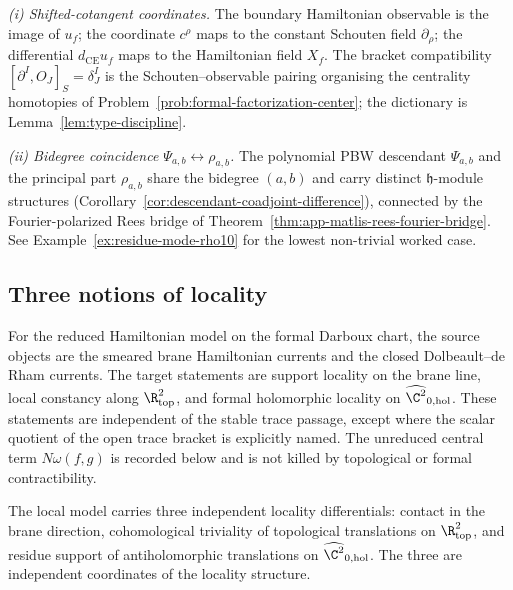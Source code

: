 \documentclass[11pt]{memoir}
\begin{document}
\begin{rmk}\label{rmk:intro-symbol-separation}
  \emph{(i) Shifted-cotangent coordinates.}  The boundary
  Hamiltonian observable is the image of \(u_f\); the coordinate
  \(c^\rho\) maps to the constant Schouten field \(\partial_\rho\);
  the differential \(d_{\mathrm{CE}}u_f\) maps to the Hamiltonian field
  \(X_f\).  The bracket compatibility
  \([\partial^I,O_J]_S=\delta^I_J\) is the Schouten--observable pairing
  organising the centrality homotopies of
  Problem~\ref{prob:formal-factorization-center}; the dictionary is
  Lemma~\ref{lem:type-discipline}.

  \emph{(ii) Bidegree coincidence \(\Psi_{a,b}\leftrightarrow\rho_{a,b}\).}
  The polynomial PBW descendant \(\Psi_{a,b}\) and the principal part
  \(\rho_{a,b}\) share the bidegree \((a,b)\) and carry distinct
  \(\mathfrak h\)-module structures
  (Corollary~\ref{cor:descendant-coadjoint-difference}), connected by
  the Fourier-polarized Rees bridge of
  Theorem~\ref{thm:app-matlis-rees-fourier-bridge}.  See
  Example~\ref{ex:residue-mode-rho10} for the lowest non-trivial
  worked case.
\end{rmk}

\subsection{Three notions of locality}\label{ssec:three-localities}

For the reduced Hamiltonian model on the formal Darboux chart, the
source objects are the smeared brane Hamiltonian currents and the closed
Dolbeault--de Rham currents.  The target statements are support locality
on the brane line, local
constancy along \(\R^2_{\mathrm{top}}\), and formal holomorphic
locality on \(\widehat{\C^2}_{0,\mathrm{hol}}\).  These statements are
independent of the stable trace passage, except where the scalar
quotient of the open trace bracket is explicitly named.  The unreduced
central term \(N\omega(f,g)\) is recorded below and is not killed by
topological or formal contractibility.

The local model carries three independent locality differentials:
contact in the brane direction, cohomological triviality of
topological translations on \(\R^2_{\mathrm{top}}\), and residue
support of antiholomorphic translations on
\(\widehat{\C^2}_{0,\mathrm{hol}}\).  The three are independent
coordinates of the locality structure.
\end{document}
